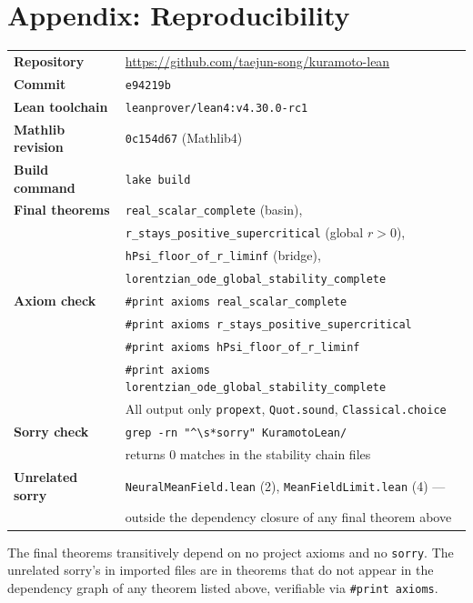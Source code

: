 \documentclass[11pt,a4paper]{article}
\theoremstyle{definition}
\begin{document}
\section*{Appendix: Reproducibility}

\begin{tabular}{ll}
\textbf{Repository} & \url{https://github.com/taejun-song/kuramoto-lean} \\
\textbf{Commit} & \texttt{e94219b} \\
\textbf{Lean toolchain} & \texttt{leanprover/lean4:v4.30.0-rc1} \\
\textbf{Mathlib revision} & \texttt{0c154d67} (Mathlib4) \\
\textbf{Build command} & \texttt{lake build} \\
\textbf{Final theorems} & \texttt{real\_scalar\_complete} (basin), \\
& \texttt{r\_stays\_positive\_supercritical} (global $r > 0$), \\
& \texttt{hPsi\_floor\_of\_r\_liminf} (bridge), \\
& \texttt{lorentzian\_ode\_global\_stability\_complete} \\
\textbf{Axiom check} & \texttt{\#print axioms real\_scalar\_complete} \\
& \texttt{\#print axioms r\_stays\_positive\_supercritical} \\
& \texttt{\#print axioms hPsi\_floor\_of\_r\_liminf} \\
& \texttt{\#print axioms lorentzian\_ode\_global\_stability\_complete} \\
& All output only \texttt{propext}, \texttt{Quot.sound}, \texttt{Classical.choice} \\
\textbf{Sorry check} & \texttt{grep -rn "\^{}\textbackslash s*sorry" KuramotoLean/} \\
& returns 0 matches in the stability chain files \\
\textbf{Unrelated sorry} & \texttt{NeuralMeanField.lean} (2), \texttt{MeanFieldLimit.lean} (4) --- \\
& outside the dependency closure of any final theorem above
\end{tabular}

\medskip\noindent The final theorems transitively depend on no project axioms and no \texttt{sorry}. The unrelated sorry's in imported files are in theorems that do not appear in the dependency graph of any theorem listed above, verifiable via \texttt{\#print axioms}.
\end{document}
